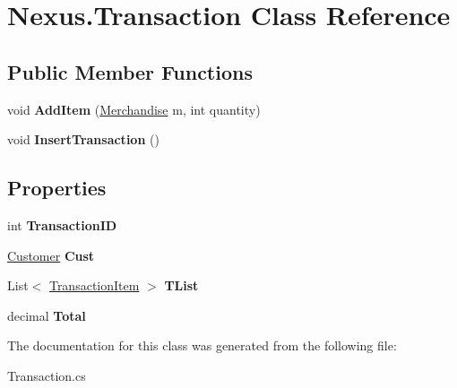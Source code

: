 \hypertarget{class_nexus_1_1_transaction}{}\section{Nexus.\+Transaction Class Reference}
\label{class_nexus_1_1_transaction}
\subsection*{Public Member Functions}
\begin{DoxyCompactItemize}
\item 
\mbox{\label{class_nexus_1_1_transaction_a88e088f63edc22a50762b251b7bfa7b6}} 
void {\bfseries Add\+Item} (\mbox{\hyperlink{class_nexus_1_1_merchandise}{Merchandise}} m, int quantity)
\item 
\mbox{\label{class_nexus_1_1_transaction_a5b76fa2172471fe5ea112b250c3950a4}} 
void {\bfseries Insert\+Transaction} ()
\end{DoxyCompactItemize}
\subsection*{Properties}
\begin{DoxyCompactItemize}
\item 
\mbox{\label{class_nexus_1_1_transaction_a6dea7432be12f49944d32a06d73a9ce6}} 
int {\bfseries Transaction\+ID}
\item 
\mbox{\label{class_nexus_1_1_transaction_ab9332d11e016e17dc17acb565d04c26a}} 
\mbox{\hyperlink{class_nexus_1_1_customer}{Customer}} {\bfseries Cust}
\item 
\mbox{\label{class_nexus_1_1_transaction_aca8a960916f33b8eb5a807924d63c60a}} 
List$<$ \mbox{\hyperlink{class_nexus_1_1_transaction_item}{Transaction\+Item}} $>$ {\bfseries T\+List}
\item 
\mbox{\label{class_nexus_1_1_transaction_ad2848a4549a7552961c1a8af7cc63b30}} 
decimal {\bfseries Total}
\end{DoxyCompactItemize}


The documentation for this class was generated from the following file\+:\begin{DoxyCompactItemize}
\item 
Transaction.\+cs\end{DoxyCompactItemize}
